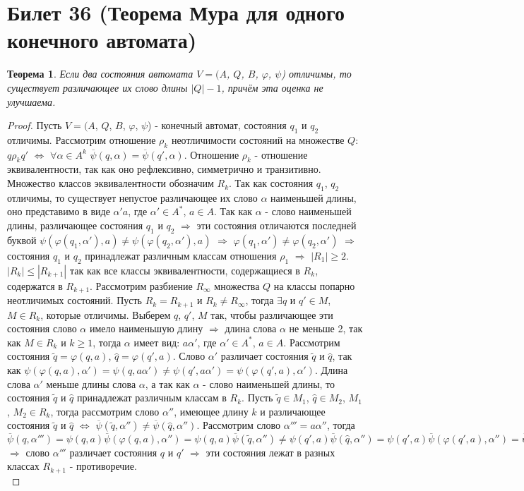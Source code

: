 \documentclass[a4paper, 12pt]{article}
\renewcommand{\phi}{\varphi}
\theoremstyle{definition}
\theoremstyle{plain}
\newtheorem*{theorem}{Теорема}
\theoremstyle{remark}
\begin{document}
  \section{Билет 36 (Теорема Мура для одного конечного автомата)}
  \begin{theorem}
    Если два состояния автомата $V=(A$, $Q$, $B$, $\phi$, $\psi$) отличимы, то существует различающее их слово длины $|Q|-1$, причём эта оценка не улучшаема.
  \end{theorem}
  \begin{proof}
    Пусть $V=(A$, $Q$, $B$, $\phi$, $\psi$) - конечный автомат, состояния $q_1$ и $q_2$ отличимы. Рассмотрим отношение $\rho_k$ неотличимости состояний на множестве $Q$: $q\rho_kq'$ $\Leftrightarrow$ $\forall\alpha\in A^k$  $\overline{\psi}(q,\alpha)=\overline{\psi}(q',\alpha)$. Отношение $\rho_k$ - отношение эквивалентности, так как оно рефлексивно, симметрично и транзитивно. Множество классов эквивалентности обозначим $R_k$. Так как состояния $q_1$, $q_2$ отличимы, то существует непустое различающее их слово $\alpha$ наименьшей длины, оно представимо в виде $\alpha'a$, где $\alpha'\in A^*$, $a\in A$. Так как $\alpha$ - слово наименьшей длины, различающее состояния $q_1$ и $q_2$ $\Longrightarrow$ эти состояния отличаются последней буквой $\psi(\phi(q_1,\alpha'),a)\neq\psi(\phi(q_2,\alpha'),a)$ $\Longrightarrow$ $\phi(q_1,\alpha')\neq\phi(q_2,\alpha')$ $\Longrightarrow$ состояния $q_1$ и $q_2$ принадлежат различным классам отношения $\rho_1$ $\Longrightarrow$ $|R_1|\geqslant2$.\\
    $|R_k|\leqslant|R_{k+1}|$ так как все классы эквивалентности, содержащиеся в $R_k$, содержатся в $R_{k+1}$. Рассмотрим разбиение $R_{\infty}$ множества $Q$ на классы попарно неотличимых состояний. Пусть $R_k=R_{k+1}$ и $R_k\neq R_{\infty}$, тогда $\exists q$ и $q'\in M$, $M\in R_k$, которые отличимы. Выберем $q$, $q'$, $M$ так, чтобы различающее эти состояния слово $\alpha$ имело наименьшую длину $\Longrightarrow$ длина слова $\alpha$ не меньше 2, так как $M\in R_k$ и $k\geqslant1$, тогда $\alpha$ имеет вид: $a\alpha'$, где $\alpha'\in A^*$, $a\in A$. Рассмотрим состояния $\tilde{q}=\phi(q,a)$, $\widehat{q}=\phi(q',a)$. Слово $\alpha'$ различает состояния $\tilde{q}$ и $\widehat{q}$, так как $\psi(\phi(q,a),\alpha')=\psi(q,a\alpha')\neq\psi(q',a\alpha')=\psi(\phi(q',a),\alpha')$. Длина слова $\alpha'$ меньше длины слова $\alpha$, а так как $\alpha$ - слово наименьшей длины, то состояния $\tilde{q}$ и $\widehat{q}$ принадлежат различным классам в $R_k$. Пусть $\tilde{q}\in M_1$, $\widehat{q}\in M_2$, $M_1$, $M_2\in R_k$, тогда рассмотрим слово $\alpha''$, имеющее длину $k$ и различающее состояния $\tilde{q}$ и $\widehat{q}$ $\Leftrightarrow$ $\overline{\psi}(\tilde{q},\alpha'')\neq\overline{\psi}(\widehat{q},\alpha'')$. Рассмотрим слово $\alpha'''=a\alpha''$, тогда $\overline{\psi}(q,\alpha''')=\psi(q,a)\overline{\psi}(\phi(q,a),\alpha'')=\psi(q,a)\overline{\psi}(\tilde{q},\alpha'')\neq\psi(q',a)\overline{\psi}(\widehat{q},\alpha'')=\psi(q',a)\overline{\psi}(\phi(q',a),\alpha'')=\overline{\psi}(q',\alpha''')$ $\Longrightarrow$ слово $\alpha'''$ различает состояния $q$ и $q'$ $\Longrightarrow$ эти состояния лежат в разных классах $R_{k+1}$ - противоречие.\\

\end{proof}
\end{document}

